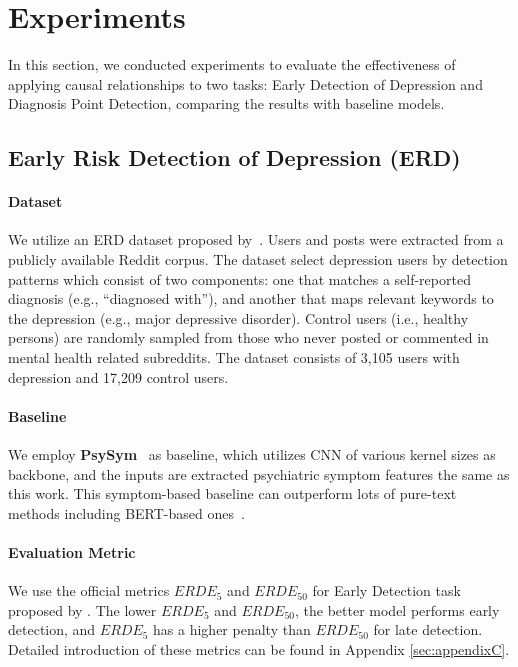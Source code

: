 \section{Experiments}
\label{sec:exp}

In this section, we conducted experiments to evaluate the effectiveness of applying causal relationships to two tasks: Early Detection of Depression and Diagnosis Point Detection, comparing the results with baseline models.

\subsection{Early Risk Detection of Depression (ERD)}
\paragraph{Dataset} We utilize an ERD dataset proposed by~\citet{chen-etal-2023-detection}. Users and posts were extracted from a publicly available Reddit corpus. The dataset select depression users by detection patterns which consist of two components: one that matches a self-reported diagnosis (e.g., “diagnosed with”), and another that maps relevant keywords to the depression (e.g., major depressive disorder). Control users (i.e., healthy persons) are randomly sampled from those who never posted or commented in mental health related subreddits. The dataset consists of 3,105 users with depression and 17,209 control users.
\paragraph{Baseline} We employ \textbf{PsySym}~\cite{Zhang2022SymptomIF} as baseline, which utilizes CNN of various kernel sizes as backbone, and the inputs are extracted psychiatric symptom features the same as this work. This symptom-based baseline can outperform lots of pure-text methods including BERT-based ones~\cite{nguyen-etal-2022-improving}.
\paragraph{Evaluation Metric} We use the official metrics $ERDE_5$ and $ERDE_{50}$ for Early Detection task proposed by \citet{losada2016test}. The lower $ERDE_5$ and $ERDE_{50}$, the better model performs early detection, and $ERDE_5$ has a higher penalty than $ERDE_{50}$ for late detection. Detailed introduction of these metrics can be found in Appendix \ref{sec:appendixC}. 

